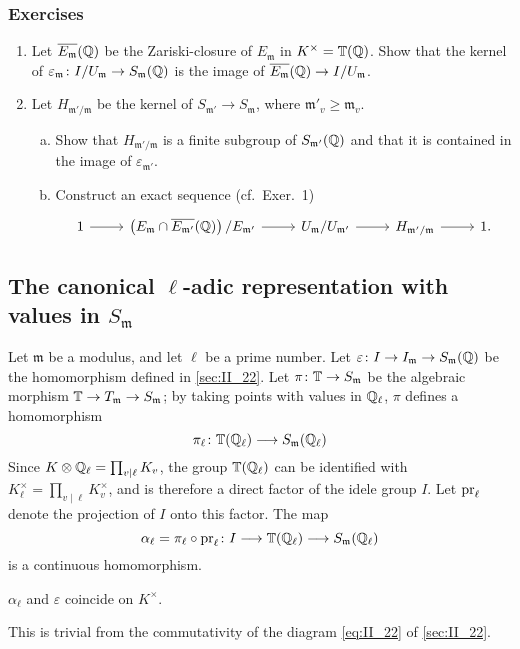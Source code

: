 \subsubsection*{Exercises}
\begin{enumerate}[1)]
\item Let $\overline{E_\mathfrak{m}}(\mathbb{Q})$ be the Zariski-closure of
	$E_{\mathfrak{m}}$ in $K^\times = \mathbb{T}(\mathbb{Q})$. Show that the kernel of
	$\varepsilon_\mathfrak{m} \colon I/U_\mathfrak{m} \to
	S_\mathfrak{m}(\mathbb{Q})$ is the image of $\overline{E_\mathfrak{m}}(\mathbb{Q}) \to
	I/U_\mathfrak{m}$.
\item Let $H_{\mathfrak{m}'/\mathfrak{m}}$ be the kernel of
	\dpage
	$S_{\mathfrak{m}'} \to S_\mathfrak{m}$, where $\mathfrak{m}'_v \geq
	\mathfrak{m}_v$.
	\begin{enumerate}[a)]
	\item Show that $H_{\mathfrak{m}'/\mathfrak{m}}$ is a finite subgroup
		of $S_{\mathfrak{m}'}(\mathbb{Q})$ and that it is contained  in the
		image of $\varepsilon_{\mathfrak{m}'}$.
	\item Construct an exact sequence (cf.\ Exer.~1)
		\[\begin{tikzcd}
		1 \arrow[r] & \left({E_\mathfrak{m} \cap
		\algcl{E_{\mathfrak{m}'}}(\Q)}\right)/ E_{\mathfrak{m}'}
				\arrow[r] & U_\mathfrak{m} / U_{\mathfrak{m}'}
				\arrow[r] & H_{\mathfrak{m}'/\mathfrak{m}}
				\arrow[r] & 1.
		\end{tikzcd}\]
	\end{enumerate}	
\end{enumerate}

\subsection{The canonical \texorpdfstring{$\ell$}{ℓ}-adic representation with
values in \texorpdfstring{$S_{\mathfrak{m}}$}{Sm}}\label{sec:II_23}
Let $\mathfrak{m}$ be a modulus, and let $\ell$ be a prime number. Let
$\varepsilon\colon I \to I_{\mathfrak{m}} \to S_{\mathfrak{m}}(\mathbb{Q})$ be the
homomorphism defined in \ref{sec:II_22}. Let $\pi\colon \mathbb{T} \to S_{\mathfrak{m}}$
be the algebraic morphism $\mathbb{T} \to T_{\mathfrak{m}} \to S_{\mathfrak{m}}$; by
taking points with values in $\mathbb{Q}_\ell$, $\pi$ defines a homomorphism
\[
	\pi_\ell \colon \mathbb{T}(\mathbb{Q}_\ell) \longrightarrow S_{\mathfrak{m}}(\mathbb{Q}_\ell)
\]
Since $K \otimes \mathbb{Q}_\ell = \prod_{v\mid\ell} K_v$, the group $\mathbb{T}(\mathbb{Q}_\ell)$ can
be identified with $K_\ell^\times = \prod_{v\mid\ell} K_v^\times$, and is
therefore a direct factor of the idele group $I$.  Let $\operatorname{pr}_\ell$ denote the
projection of $I$ onto this factor. The map
\[
	\alpha_\ell = \pi_\ell \circ \operatorname{pr}_\ell \colon I \longrightarrow \mathbb{T}(\mathbb{Q}_\ell)
	\longrightarrow S_{\mathfrak{m}}(\mathbb{Q}_\ell)
\]
is a continuous homomorphism.
\begin{lem}
	$\alpha_\ell$ and $\varepsilon$ coincide on $K^\times$.
\end{lem}
This is trivial from the commutativity of the diagram \eqref{eq:II_22} of
\ref{sec:II_22}.

